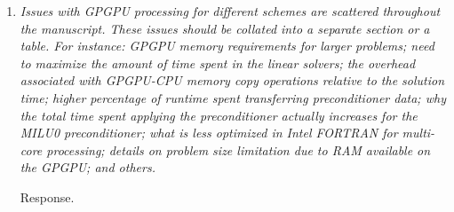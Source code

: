 \documentclass[12pt]{article} %
\begin{document}
\begin{enumerate}
\item \textit{Issues with GPGPU processing for different schemes are scattered throughout the manuscript. These issues should be collated into a separate section or a table. For instance: GPGPU memory requirements for larger problems; need to maximize the amount of time spent in the linear solvers; the overhead associated with GPGPU-CPU memory copy operations relative to the solution time; higher percentage of runtime spent transferring preconditioner data; why the total time spent applying the preconditioner actually increases for the MILU0 preconditioner; what is less optimized in Intel FORTRAN for multi-core processing; details on problem size limitation due to RAM available on the GPGPU; and others.} 

Response.

\end{enumerate}
\end{document}
